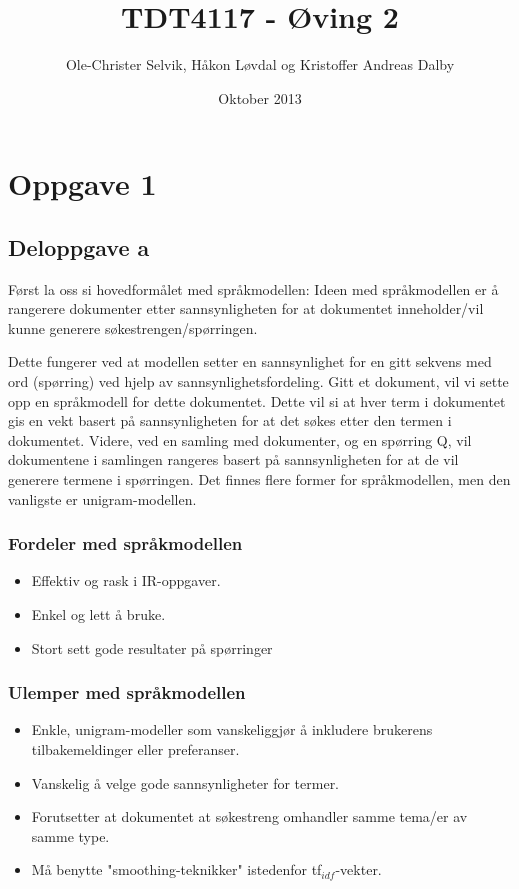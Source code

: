 \documentclass[]{article}
\begin{document}
\title{TDT4117 - Øving 2}
\author{Ole-Christer Selvik, Håkon Løvdal og Kristoffer Andreas Dalby}
\date{Oktober 2013}
\maketitle

\pagebreak

\section*{Oppgave 1}
\subsection*{Deloppgave a}

\noindent Først la oss si hovedformålet med språkmodellen: Ideen med språkmodellen er å rangerere dokumenter etter sannsynligheten for at dokumentet inneholder/vil kunne generere søkestrengen/spørringen. 


Dette fungerer ved at modellen setter en sannsynlighet for en gitt sekvens med ord (spørring) ved hjelp av sannsynlighetsfordeling. Gitt et dokument, vil vi sette opp en språkmodell for dette dokumentet. Dette vil si at hver term i dokumentet gis en vekt basert på sannsynligheten for at det søkes etter den termen i dokumentet. Videre, ved en samling med dokumenter, og en spørring Q, vil dokumentene i samlingen rangeres basert på sannsynligheten for at de vil generere termene i spørringen. Det finnes flere former for språkmodellen, men den vanligste er unigram-modellen. 

\subsubsection*{Fordeler med språkmodellen}

\begin{itemize}
    \item Effektiv og rask i IR-oppgaver.
    \item Enkel og lett å bruke.
    \item Stort sett gode resultater på spørringer
\end{itemize}

\subsubsection*{Ulemper med språkmodellen}

\begin{itemize}
    \item Enkle, unigram-modeller som vanskeliggjør å inkludere brukerens tilbakemeldinger eller preferanser.
    \item Vanskelig å velge gode sannsynligheter for termer.
    \item Forutsetter at dokumentet at søkestreng omhandler samme tema/er av samme type.
    \item Må benytte "smoothing-teknikker" istedenfor tf$_{idf}$-vekter.
\end{itemize}
\end{document}
